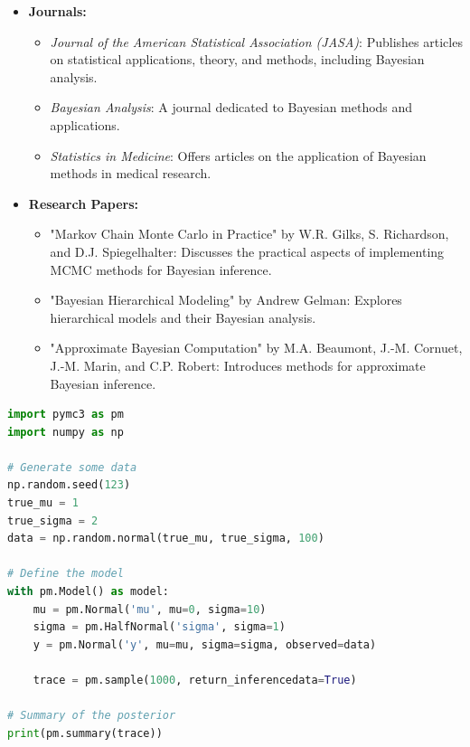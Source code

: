 \documentclass[12pt]{book} %
\begin{document}
\begin{itemize}
    \item \textbf{Journals:}
        \begin{itemize}
            \item \textit{Journal of the American Statistical Association (JASA)}: Publishes articles on statistical applications, theory, and methods, including Bayesian analysis.
            \item \textit{Bayesian Analysis}: A journal dedicated to Bayesian methods and applications.
            \item \textit{Statistics in Medicine}: Offers articles on the application of Bayesian methods in medical research.
        \end{itemize}
    \item \textbf{Research Papers:}
        \begin{itemize}
            \item "Markov Chain Monte Carlo in Practice" by W.R. Gilks, S. Richardson, and D.J. Spiegelhalter: Discusses the practical aspects of implementing MCMC methods for Bayesian inference.
            \item "Bayesian Hierarchical Modeling" by Andrew Gelman: Explores hierarchical models and their Bayesian analysis.
            \item "Approximate Bayesian Computation" by M.A. Beaumont, J.-M. Cornuet, J.-M. Marin, and C.P. Robert: Introduces methods for approximate Bayesian inference.
        \end{itemize}
\end{itemize}

\FloatBarrier
\begin{lstlisting}[language=Python, caption={Example Python code using PyMC3 for Bayesian inference}]
import pymc3 as pm
import numpy as np

# Generate some data
np.random.seed(123)
true_mu = 1
true_sigma = 2
data = np.random.normal(true_mu, true_sigma, 100)

# Define the model
with pm.Model() as model:
    mu = pm.Normal('mu', mu=0, sigma=10)
    sigma = pm.HalfNormal('sigma', sigma=1)
    y = pm.Normal('y', mu=mu, sigma=sigma, observed=data)
    
    trace = pm.sample(1000, return_inferencedata=True)

# Summary of the posterior
print(pm.summary(trace))
\end{lstlisting}
\FloatBarrier
\end{document}
